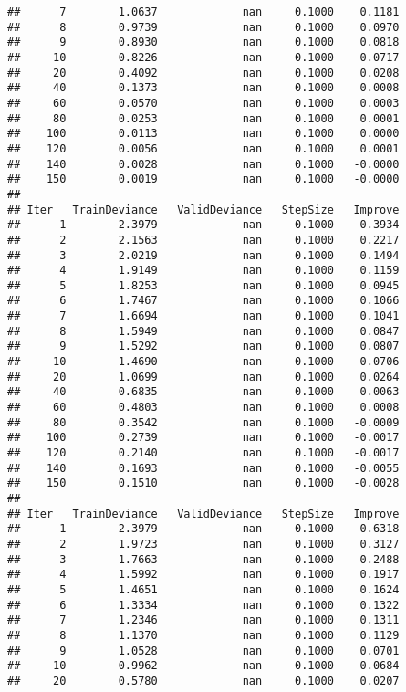 \documentclass[]{article}
\begin{document}
\begin{verbatim}
##      7        1.0637             nan     0.1000    0.1181
##      8        0.9739             nan     0.1000    0.0970
##      9        0.8930             nan     0.1000    0.0818
##     10        0.8226             nan     0.1000    0.0717
##     20        0.4092             nan     0.1000    0.0208
##     40        0.1373             nan     0.1000    0.0008
##     60        0.0570             nan     0.1000    0.0003
##     80        0.0253             nan     0.1000    0.0001
##    100        0.0113             nan     0.1000    0.0000
##    120        0.0056             nan     0.1000    0.0001
##    140        0.0028             nan     0.1000   -0.0000
##    150        0.0019             nan     0.1000   -0.0000
## 
## Iter   TrainDeviance   ValidDeviance   StepSize   Improve
##      1        2.3979             nan     0.1000    0.3934
##      2        2.1563             nan     0.1000    0.2217
##      3        2.0219             nan     0.1000    0.1494
##      4        1.9149             nan     0.1000    0.1159
##      5        1.8253             nan     0.1000    0.0945
##      6        1.7467             nan     0.1000    0.1066
##      7        1.6694             nan     0.1000    0.1041
##      8        1.5949             nan     0.1000    0.0847
##      9        1.5292             nan     0.1000    0.0807
##     10        1.4690             nan     0.1000    0.0706
##     20        1.0699             nan     0.1000    0.0264
##     40        0.6835             nan     0.1000    0.0063
##     60        0.4803             nan     0.1000    0.0008
##     80        0.3542             nan     0.1000   -0.0009
##    100        0.2739             nan     0.1000   -0.0017
##    120        0.2140             nan     0.1000   -0.0017
##    140        0.1693             nan     0.1000   -0.0055
##    150        0.1510             nan     0.1000   -0.0028
## 
## Iter   TrainDeviance   ValidDeviance   StepSize   Improve
##      1        2.3979             nan     0.1000    0.6318
##      2        1.9723             nan     0.1000    0.3127
##      3        1.7663             nan     0.1000    0.2488
##      4        1.5992             nan     0.1000    0.1917
##      5        1.4651             nan     0.1000    0.1624
##      6        1.3334             nan     0.1000    0.1322
##      7        1.2346             nan     0.1000    0.1311
##      8        1.1370             nan     0.1000    0.1129
##      9        1.0528             nan     0.1000    0.0701
##     10        0.9962             nan     0.1000    0.0684
##     20        0.5780             nan     0.1000    0.0207

\end{verbatim}
\end{document}
